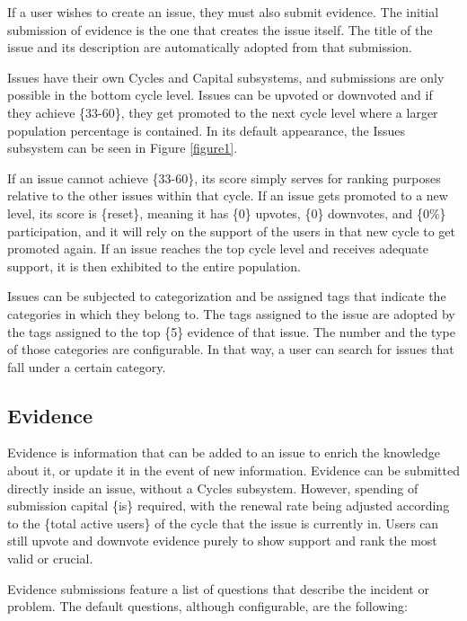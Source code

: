 \documentclass[a4paper,11pt]{article}
\begin{document}
\begin{multicols}{2}
If a user wishes to create an issue, they must also submit evidence. The initial submission of evidence is the one that creates the issue itself. The title of the issue and its description are automatically adopted from that submission.



Issues have their own Cycles and Capital subsystems, and submissions are only possible in the bottom cycle level. Issues can be upvoted or downvoted and if they achieve \{33-60\}, they get promoted to the next cycle level where a larger population percentage is contained. In its default appearance, the Issues subsystem can be seen in Figure \ref{figure1}.

If an issue cannot achieve \{33-60\}, its score simply serves for ranking purposes relative to the other issues within that cycle. If an issue gets promoted to a new level, its score is \{reset\}, meaning it has \{0\} upvotes, \{0\} downvotes, and \{0\%\} participation, and it will rely on the support of the users in that new cycle to get promoted again. If an issue reaches the top cycle level and receives adequate support, it is then exhibited to the entire population.

Issues can be subjected to categorization and be assigned tags that indicate the categories in which they belong to. The tags assigned to the issue are adopted by the tags assigned to the top \{5\} evidence of that issue. The number and the type of those categories are configurable. In that way, a user can search for issues that fall under a certain category.

\subsection{Evidence} \label{evidence}

Evidence is information that can be added to an issue to enrich the knowledge about it, or update it in the event of new information. Evidence can be submitted directly inside an issue, without a Cycles subsystem. However, spending of submission capital \{is\} required, with the renewal rate being adjusted according to the \{total active users\} of the cycle that the issue is currently in. Users can still upvote and downvote evidence purely to show support and rank the most valid or crucial.

Evidence submissions feature a list of questions that describe the incident or problem. The default questions, although configurable, are the following:


\end{multicols}
\end{document}
